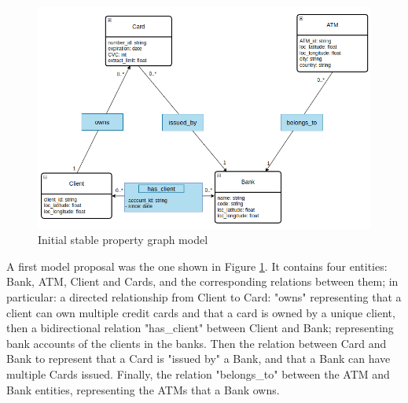 \documentclass{article}
\begin{document}
\begin{figure}[H]
    \centering
    \hspace*{-2cm}
    \includegraphics[scale = 0.45]{images/diag-PG-stable-updated.png}
    \caption{Initial stable property graph model}
    \label{img:pg-stable}
\end{figure}

A first model proposal was the one shown in Figure \ref{img:pg-stable}. It contains four entities: Bank, ATM, Client and Cards, and the corresponding relations between them; in particular: a directed relationship from Client to Card: "owns" representing that a client can own multiple credit cards and that a card is owned by a unique client, then a bidirectional relation "has\_client" between Client and Bank; representing bank accounts of the clients in the banks. Then the relation between Card and Bank to represent that a Card is "issued by" a Bank, and that a Bank can have multiple Cards issued. Finally, the relation "belongs\_to" between the ATM and Bank entities, representing the ATMs that a Bank owns.
\end{document}
